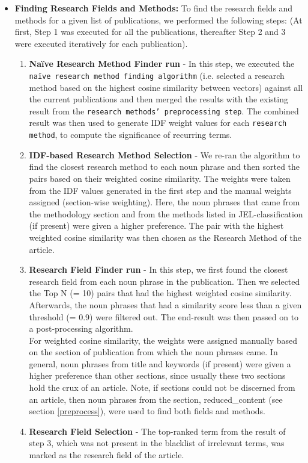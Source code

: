 \documentclass[runningheads]{llncs}
\begin{document}
\begin{itemize}
    \item \textbf{Finding Research Fields and Methods:} To find the research fields and methods for a given list of publications, we performed the following steps: (At first, Step 1 was executed for all the publications, thereafter Step 2 and 3 were executed iteratively for each publication).
\begin{enumerate}
    \item \textbf{Naïve Research Method Finder run} - In this step, we executed the \texttt{naïve research method finding algorithm} (i.e. selected a research method based on the highest cosine similarity between vectors) against all the current publications and then merged the results with the existing result from the \texttt{research methods' preprocessing step}. The combined result was then used to generate IDF weight values for each \texttt{research method}, to compute the significance of recurring terms.
    \smallskip
    \smallskip
    \item \textbf{IDF-based Research Method Selection} - %
    We re-ran the algorithm to find the closest research method to each noun phrase and then sorted the pairs based on their weighted cosine similarity. The weights were taken from the IDF values generated in the first step and the manual weights assigned (section-wise weighting). %
    Here, the noun phrases that came from the methodology section and from the methods listed in JEL-classification (if present) were given a higher preference. The pair with the highest weighted cosine similarity was then chosen as the Research Method of the article.
    \item \textbf{Research Field Finder run} - In this step, we first found the closest research field from each noun phrase in the publication. Then we selected the Top N (= 10) pairs that had the highest weighted cosine similarity. Afterwards, the noun phrases that had a similarity score less than a given threshold (= 0.9) were filtered out. The end-result was then passed on to a post-processing algorithm. \\ %
    For weighted cosine similarity, the weights were assigned manually based on the section of publication from which the noun phrases came. In general, noun phrases from title and keywords (if present) were given a higher preference than other sections, since usually these two sections hold the crux of an article. Note, if sections could not be discerned from an article, then noun phrases from the section, reduced\_content (see section \ref{preprocess}), were used to find both fields and methods.
    \smallskip
    \item \textbf{Research Field Selection} - The top-ranked term from the %
    result of step 3, which was not present in the blacklist of irrelevant terms, was marked as the research field of the article.
    \smallskip
\end{enumerate}
\end{itemize}
\end{document}
